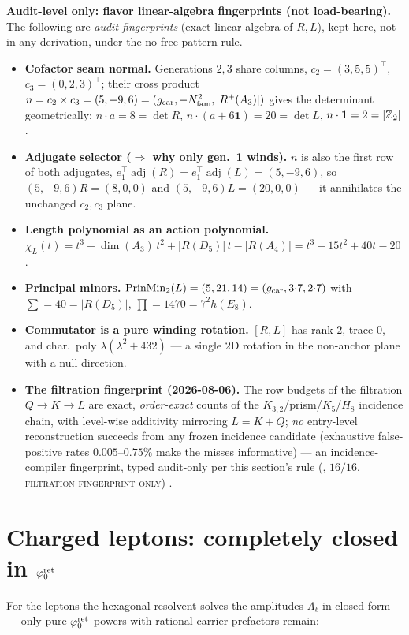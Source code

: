 \par\smallskip\noindent\textbf{Audit-level only: flavor linear-algebra fingerprints (not load-bearing).}
The following are \emph{audit fingerprints} (exact linear algebra of $R,L$), kept here, not in any
derivation, under the no-free-pattern rule. \mE
\begin{itemize}\setlength\itemsep{2pt}
\item\textbf{Cofactor seam normal.} Generations $2,3$ share columns, $c_2{=}(3,5,5)^{\!\top}$,
$c_3{=}(0,2,3)^{\!\top}$; their cross product $n=c_2\times c_3=(5,-9,6)=(g_{\mathrm{car}},-N_{\mathrm{fam}}^2,|R^+(A_3)|)$
gives the determinant geometrically: $n\cdot a=8=\det R$, $n\cdot(a{+}6\mathbf1)=20=\det L$, $n\cdot\mathbf1=2=|\mathbb{Z}_2|$.
\item\textbf{Adjugate selector ($\Rightarrow$ why only gen.\ 1 winds).} $n$ is also the first row of both
adjugates, $e_1^{\!\top}\!\operatorname{adj}(R)=e_1^{\!\top}\!\operatorname{adj}(L)=(5,-9,6)$, so
$(5,-9,6)R=(8,0,0)$ and $(5,-9,6)L=(20,0,0)$ --- it annihilates the unchanged $c_2,c_3$ plane.
\item\textbf{Length polynomial as an action polynomial.}
$\chi_L(t)=t^3-\dim(A_3)\,t^2+|R(D_5)|\,t-|R(A_4)|=t^3-15t^2+40t-20$.
\item\textbf{Principal minors.} $\operatorname{PrinMin}_2(L)=(5,21,14)=(g_{\mathrm{car}},3{\cdot}7,2{\cdot}7)$ with
$\sum=40=|R(D_5)|$, $\prod=1470=7^2 h(E_8)$.
\item\textbf{Commutator is a pure winding rotation.} $[R,L]$ has rank $2$, trace $0$, and char.\ poly
$\lambda(\lambda^2+432)$ --- a single $2$D rotation in the non-anchor plane with a null direction.
\item\textbf{The filtration fingerprint (2026-08-06).} The row budgets of the filtration
$Q\to K\to L$ are exact, \emph{order-exact} counts of the $K_{3,2}$/prism/$K_5$/$H_8$ incidence
chain, with level-wise additivity mirroring $L=K+Q$; \emph{no} entry-level reconstruction succeeds
from any frozen incidence candidate (exhaustive false-positive rates $0.005$--$0.75\%$ make the
misses informative) --- an incidence-compiler fingerprint, typed audit-only per this section's rule
(, $16/16$, \textsc{filtration-fingerprint-only}) \mE.
\end{itemize}
\par\smallskip

\section{Charged leptons: completely closed in $\varphi_0^{\mathrm{ret}}$}
For the leptons the hexagonal resolvent solves the amplitudes $\Lambda_\ell$ in closed form --- only pure
$\varphi_0^{\mathrm{ret}}$ powers with rational carrier prefactors remain:

